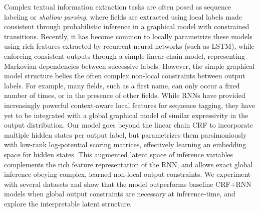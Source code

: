 Complex textual information extraction tasks are often posed as sequence labeling or \emph{shallow parsing}, where fields are extracted using local labels made consistent through probabilistic inference in a graphical model with constrained transitions. Recently, it has become common to locally parametrize these models using rich features extracted by recurrent neural networks (such as LSTM), while enforcing consistent outputs through a simple linear-chain model, representing Markovian dependencies between successive labels. However, the simple graphical model structure belies the often complex non-local constraints between output labels. For example, many fields, such as a first name, can only occur a fixed number of times, or in the presence of other fields. While RNNs have provided increasingly powerful context-aware local features for sequence tagging, they have yet to be integrated with a global graphical model of similar expressivity in the output distribution. Our model goes beyond the linear chain CRF to incorporate multiple hidden states per output label, but parametrizes them parsimoniously with low-rank log-potential scoring matrices, effectively learning an embedding space for hidden states. This augmented latent space of inference variables complements the rich feature representation of the RNN, and allows exact global inference obeying complex, learned non-local output constraints. We experiment with several datasets and show that the model outperforms baseline CRF+RNN models when global output constraints are necessary at inference-time, and explore the interpretable latent structure.
